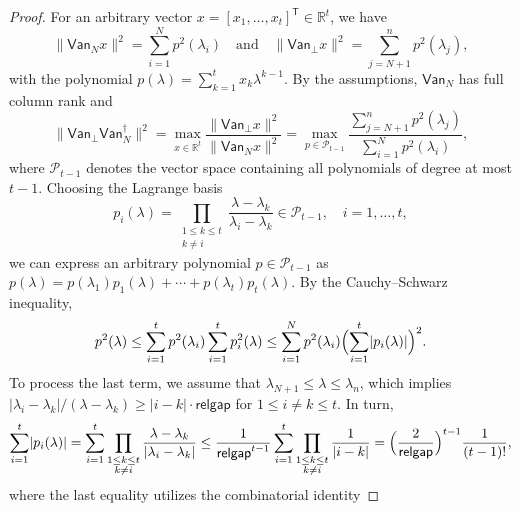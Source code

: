 \documentclass[10pt,a4paper]{amsart}
\newcommand{\R}{\mathbb{R}}
\newcommand{\Ttran}{\mathsf{T}}
\newcommand{\gap}{\mathsf{relgap}}
\newcommand{\van}{\mathsf{Van}}
\providecommand{\abs}[1]{\lvert#1\rvert}
\providecommand{\norm}[1]{\lVert#1\rVert}
\begin{document}
\begin{proof}
For an arbitrary vector $x = [x_{1},\dotsc,x_{t}]^{\Ttran}\in\R^{t}$, we have
    \begin{equation*}
        \norm{\van_{N}x}^{2} = \sum_{i=1}^{N}p^{2}(\lambda_{i})
        \quad \text{and} \quad 
        \norm{\van_{\perp}x}^{2} = \sum_{j=N+1}^{n}p^{2}(\lambda_{j}),
    \end{equation*}
    with the polynomial $p(\lambda) = \sum_{k=1}^{t}x_{k}\lambda^{k-1}$. By the assumptions, 
$\van_{N}$ has full column rank and
    \begin{equation}
        \label{estvan1}
        \norm{\van_{\perp}\van_{N}^{\dagger}}^{2} = \max_{x\in \R^{t}}\frac{\norm{\van_{\perp}x}^{2}}{\norm{\van_{N}x}^{2}} = \max_{p\in \mathcal{P}_{t-1}}\frac{\sum_{j=N+1}^{n}p^{2}(\lambda_{j})}{\sum_{i=1}^{N}p^{2}(\lambda_{i})},
    \end{equation} 
    where $\mathcal{P}_{t-1}$ denotes the vector space containing all polynomials of degree at most $t-1$. Choosing the Lagrange basis 
    \[
        p_{i}(\lambda) = \prod_{\substack{1\leq k\leq t\\ k\neq i}}\frac{\lambda-\lambda_{k}}{\lambda_{i}-\lambda_{k}}\in\mathcal{P}_{t-1}, \quad i = 1, \dotsc, t,
    \] 
    we can express an arbitrary polynomial $p\in\mathcal{P}_{t-1}$ as
    $
        p(\lambda) = p(\lambda_{1})p_{1}(\lambda) + \dotsb  + p(\lambda_{t})p_{t}(\lambda).
    $
    By the Cauchy--Schwarz inequality,
    \begin{equation} \label{eq:cauchyschwartz}
        p^{2}(\lambda) \leq \sum_{i=1}^{t}p^{2}(\lambda_{i})\sum_{i=1}^{t}p_{i}^{2}(\lambda)
        \leq \sum_{i=1}^{N}p^{2}(\lambda_{i})\Bigl(\sum_{i=1}^{t}\abs{p_{i}(\lambda)}\Bigr)^{2}.
    \end{equation}
    To process the last term, we assume that $\lambda_{N+1}\leq \lambda\leq \lambda_{n}$, which implies 
$\abs{\lambda_{i}-\lambda_{k}}/(\lambda-\lambda_{k})\geq \abs{i-k}\cdot\gap$ for $1\leq i\neq k\leq t$. In turn,
    \begin{equation*}
        \sum_{i=1}^{t}\abs{p_{i}(\lambda)}=\sum_{i=1}^{t}\prod_{\substack{1\leq k\leq t\\ k\neq i}}\frac{\lambda-\lambda_{k}}{\abs{\lambda_{i}-\lambda_{k}}}\leq \frac{1}{\gap^{t-1}}\sum_{i=1}^{t}\prod_{\substack{1\leq k\leq t\\ k\neq i}}\frac{1}{\abs{i-k}} = \Bigl(\frac{2}{\gap}\Bigr)^{t-1}\frac{1}{(t-1)!},
    \end{equation*}
    where the last equality utilizes the combinatorial identity

\end{proof}
\end{document}
